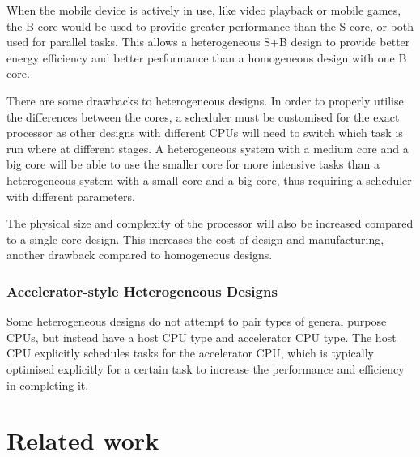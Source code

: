 When the mobile device is actively in use, like video playback or mobile games, the B core would be used to provide greater performance than the S core, or both used for parallel tasks. This allows a heterogeneous S+B design to provide better energy efficiency and better performance than a homogeneous design with one B core.

There are some drawbacks to heterogeneous designs. In order to properly utilise the differences between the cores, a scheduler must be customised for the exact processor as other designs with different CPUs will need to switch which task is run where at different stages. A heterogeneous system with a medium core and a big core will be able to use the smaller core for more intensive tasks than a heterogeneous system with a small core and a big core, thus requiring a scheduler with different parameters.

The physical size and complexity of the processor will also be increased compared to a single core design. This increases the cost of design and manufacturing, another drawback compared to homogeneous designs.

\subsubsection{Accelerator-style Heterogeneous Designs}
Some heterogeneous designs do not attempt to pair types of general purpose CPUs, but instead have a host CPU type and accelerator CPU type. The host CPU explicitly schedules tasks for the accelerator CPU, which is typically optimised explicitly for a certain task to increase the performance and efficiency in completing it.

\section{Related work}
